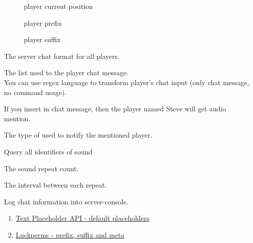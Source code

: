 
\begin{description}
    \item[] player current position
    \item[] player prefix
    \item[] player suffix
\end{description}


The server chat format for all players.

The  list used to  the player chat message.\\
You can use regex language to transform player's chat input (only chat message, no command usage).

If you insert  in chat message, then the player named Steve will get audio mention.


The type of  used to notify the mentioned player.
\begin{tips}{Query all identifiers of sound}
\end{tips}




The sound repeat count.


The interval between each repeat.

Log chat information into server-console.




\begin{enumerate}
    \item \href{https://placeholders.pb4.eu/user/default-placeholders/}{Text Placeholder API - default placeholders}
    \item \href{https://luckperms.net/wiki/Prefixes,-Suffixes-&-Meta}{Luckperms - prefix, suffix and meta}
\end{enumerate}